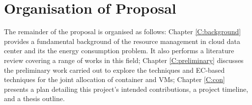 \section{Organisation of Proposal}
The remainder of the proposal is organised as follows: Chapter \ref{C:background} provides a fundamental
background of  the resource management in cloud data center and its the energy consumption problem. It also performs a literature review covering a range of works in this field; Chapter \ref{C:preliminary} discusses the preliminary work carried out to explore the techniques and EC-based techniques for the joint allocation of container and VMs; Chapter \ref{C:con} presents a plan
detailing this project’s intended contributions, a project timeline, and a thesis outline.
